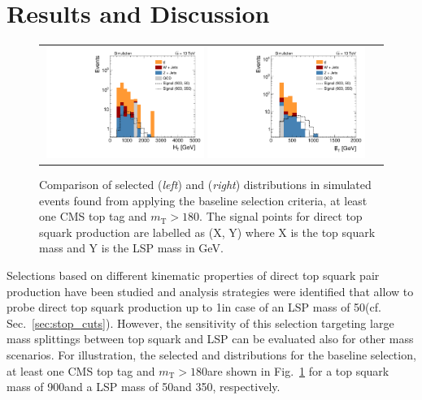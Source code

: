 \section{Results and Discussion}
\label{sec:stop_results}
\begin{figure}[!t]
  \centering
  \begin{tabular}{cc}
   
      \includegraphics[width=0.49\textwidth]{figures/Stop_TopTagTransverseMass_HThad_HighLSPMass.pdf}  
      \includegraphics[width=0.49\textwidth]{figures/Stop_TopTagTransverseMass_MET_HighLSPMass.pdf} 
    \end{tabular}
 
  \caption{Comparison of selected \HT (\textit{left}) and \met (\textit{right}) distributions in simulated events found from applying the baseline selection criteria, at least one CMS top tag and $m_\mathrm{T} > 180$\gev. The signal points for direct top squark production are labelled as (X, Y) where X is the top squark mass and Y is the LSP mass in GeV.}
  \label{fig:stop_highLSP_ht_met}
\end{figure}
Selections based on different kinematic properties of direct top squark pair production have been studied and analysis strategies were identified that allow to probe direct top squark production up to 1\tev in case of an LSP mass of 50\gev (cf. Sec.~\ref{sec:stop_cuts}). However, the sensitivity of this selection targeting large mass splittings between top squark and LSP can be evaluated also for other mass scenarios. For illustration, the selected \HT and \met distributions for the baseline selection, at least one CMS top tag and $m_\mathrm{T} > 180$\gev are shown in Fig.~\ref{fig:stop_highLSP_ht_met} for a top squark mass of 900\gev and a LSP mass of 50\gev and 350\gev, respectively. \\
